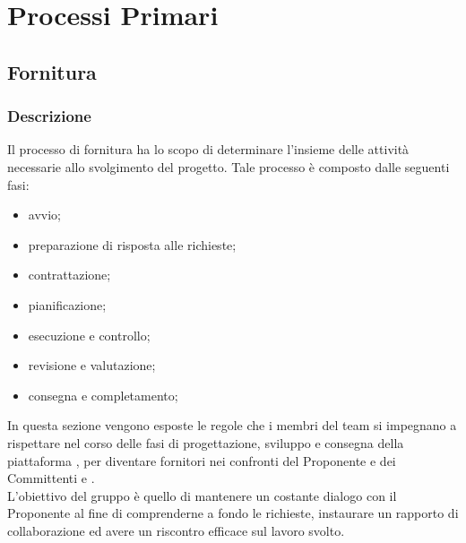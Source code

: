 \section{Processi Primari}
    \subsection{Fornitura}
        \subsubsection{Descrizione}
        Il processo di fornitura ha lo scopo di determinare l'insieme delle attività necessarie allo svolgimento del progetto. Tale processo è composto dalle seguenti fasi:
        \begin{itemize}
            \item{avvio;}
            \item{preparazione di risposta alle richieste;}
            \item{contrattazione;}
            \item{pianificazione;}
            \item{esecuzione e controllo;}
            \item{revisione e valutazione;}
            \item{consegna e completamento;}
        \end{itemize}
         In questa sezione vengono esposte le regole che i membri del team \Gruppo{} si impegnano a rispettare nel corso delle fasi di progettazione, sviluppo e consegna della piattaforma \NomeProgetto{}, per diventare fornitori nei confronti del Proponente \Proponente{} e dei Committenti \TV{} e \RC{}. \\
         L'obiettivo del gruppo è quello di mantenere un costante dialogo con il Proponente al fine di comprenderne a fondo le richieste, instaurare un rapporto di collaborazione ed avere un riscontro efficace sul lavoro svolto.
        
